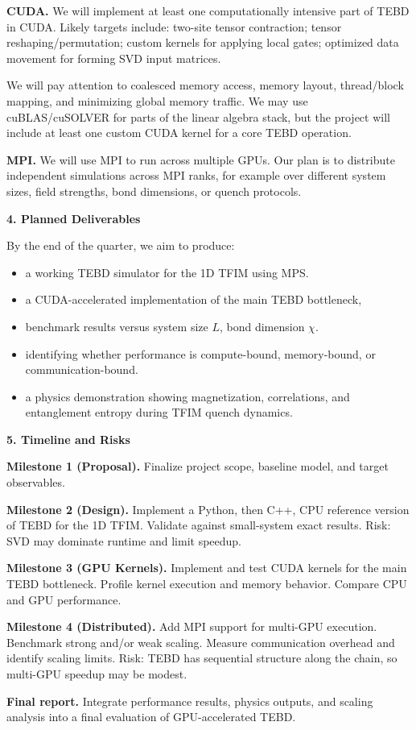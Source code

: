 \documentclass[11pt]{article}
\begin{document}
\textbf{CUDA.} We will implement at least one computationally intensive part of TEBD in CUDA. Likely targets include: two-site tensor contraction; tensor reshaping/permutation; custom kernels for applying local gates; optimized data movement for forming SVD input matrices.

We will pay attention to coalesced memory access, memory layout, thread/block mapping, and minimizing global memory traffic. We may use cuBLAS/cuSOLVER for parts of the linear algebra stack, but the project will include at least one custom CUDA kernel for a core TEBD operation.

\textbf{MPI.} We will use MPI to run across multiple GPUs. Our plan is to distribute independent simulations across MPI ranks, for example over different system sizes, field strengths, bond dimensions, or quench protocols.


\vspace{0.4em}
\textbf{4. Planned Deliverables}

By the end of the quarter, we aim to produce:
\begin{itemize}
    \item a working TEBD simulator for the 1D TFIM using MPS.
    \item a CUDA-accelerated implementation of the main TEBD bottleneck,
    \item benchmark results versus system size $L$, bond dimension $\chi$.
    \item identifying whether performance is compute-bound, memory-bound, or communication-bound.
    \item a physics demonstration showing magnetization, correlations, and entanglement entropy during TFIM quench dynamics.
\end{itemize}

\vspace{0.4em}
\textbf{5. Timeline and Risks}

\textbf{Milestone 1 (Proposal).}
Finalize project scope, baseline model, and target observables.

\textbf{Milestone 2 (Design).} Implement a Python, then C++, CPU reference version of TEBD for the 1D TFIM. Validate against small-system exact results.  Risk: SVD may dominate runtime and limit speedup.

\textbf{Milestone 3 (GPU Kernels).}
Implement and test CUDA kernels for the main TEBD bottleneck. Profile kernel execution and memory behavior. Compare CPU and GPU performance.

\textbf{Milestone 4 (Distributed).}
Add MPI support for multi-GPU execution. Benchmark strong and/or weak scaling. Measure communication overhead and identify scaling limits. Risk: TEBD has sequential structure along the chain, so multi-GPU speedup may be modest.

\textbf{Final report.}
Integrate performance results, physics outputs, and scaling analysis into a final evaluation of GPU-accelerated TEBD.
\end{document}
